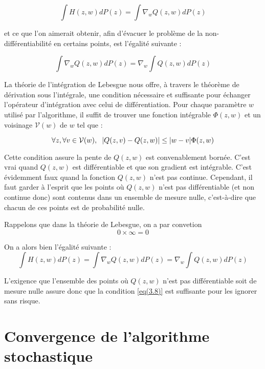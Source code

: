 \documentclass{article}
\begin{document}
\begin{equation*}
    \int H(z, w) dP(z) = \int \nabla_w Q(z, w) dP(z)
\end{equation*}

et ce que l'on aimerait obtenir, afin d'évacuer le problème de la non-différentiabilité en certains points, est l'égalité suivante :

\begin{equation*}
    \int \nabla_w Q(z, w) dP(z) = \nabla_w \int Q(z, w) dP(z)
\end{equation*}

La théorie de l'intégration de Lebesgue nous offre, à travers le théorème de dérivation sous l'intégrale, une condition nécessaire et suffisante pour échanger l'opérateur d'intégration avec celui de différentiation. Pour chaque paramètre $w$ utilisé par l'algorithme, il suffit de trouver une fonction intégrable $\Phi(z, w)$ et un voisinage $\mathcal{V}(w)$ de $w$ tel que : 

\begin{equation} \label{eq(3.8)}
    \forall z, \forall v \in \mathcal{V}(w), \hspace{0.2cm} |Q(z, v) - Q(z, w)| \leq |w - v| \Phi(z, w) 
\end{equation}

Cette condition assure la pente de $Q(z, w)$ est convenablement bornée. C'est vrai quand $Q(z, w)$ est différentiable et que son gradient est intégrable. C'est évidemment faux quand la fonction $Q(z, w)$ n'est pas continue. Cependant, il faut garder à l'esprit que les points où $Q(z, w)$ n'est pas différentiable (et non continue donc) sont contenus dans un ensemble de mesure nulle, c'est-à-dire que chacun de ces points est de probabilité nulle.  

Rappelons que dans la théorie de Lebesgue, on a par convetion 
\begin{equation*}
    0 \times \infty = 0
\end{equation*}

On a alors bien l'égalité suivante :
\begin{equation*}
    \int H(z, w) dP(z) = \int \nabla_w Q(z, w) dP(z) = \nabla_w \int Q(z, w) dP(z)
\end{equation*}

L'exigence que l'ensemble des points où $Q(z, w)$ n'est pas différentiable soit de mesure nulle assure donc que la condition \eqref{eq(3.8)} est suffisante pour les ignorer sans risque.

\section{Convergence de l'algorithme stochastique}
\end{document}
